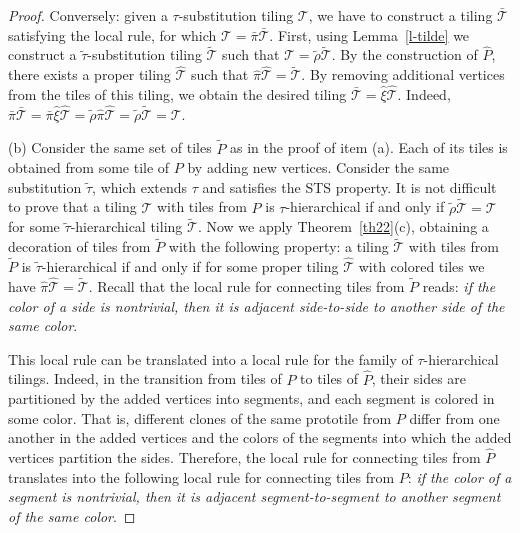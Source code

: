 \documentclass[12pt]{article}
\theoremstyle{remark}
\begin{document}
\begin{proof}
Conversely: given a $\tau$-substitution tiling $\mathcal T$, we have 
to construct a tiling $\bar{\mathcal T}$ satisfying the local rule,
for which $\mathcal T=\bar{\pi}\bar{\mathcal T}$.
First, using Lemma~\ref{l-tilde}
we construct a $\tilde\tau$-substitution tiling $\tilde{\mathcal T}$ such that
$\mathcal T=\tilde{\rho}\tilde{\mathcal T}$.
By the construction of $\hat P$, there exists a
proper tiling $\hat{\mathcal T}$ such that $\hat\pi\hat{\mathcal T}=\tilde{\mathcal T}$. By removing additional vertices from the tiles of this tiling,
we obtain the desired tiling $\bar{\mathcal T}=\hat\xi\hat{\mathcal T}$.
Indeed,
$
\bar\pi\bar{\mathcal T}=\bar\pi\hat\xi\hat{\mathcal T}=\tilde\rho\hat\pi\hat{\mathcal T}=\tilde{\rho}\tilde{\mathcal T}={\mathcal T}.
$
 



(b) Consider the same set of tiles $\tilde P$ as in the proof of item (a).
Each of its tiles is obtained from some tile of 
$P$ by adding new vertices. Consider 
the same substitution $\tilde\tau$, which extends $\tau$ and satisfies the STS property.
It is not difficult to prove that a tiling $\mathcal T$ with tiles from $P$ is $\tau$-hierarchical if and only if 
$\tilde\rho\tilde{\mathcal T}=\mathcal T$ for some  $\tilde\tau$-hierarchical tiling 
$\tilde{\mathcal T}$. 
Now we apply Theorem~\ref{th22}(c), 
obtaining a decoration of tiles from $\tilde P$ with the following property:
a tiling $\tilde{\mathcal T}$ with tiles from $\tilde P$ is $\tilde\tau$-hierarchical
if and only if for some proper tiling $\hat{\mathcal T}$ with colored 
tiles we have $\hat\pi \hat{\mathcal T}=\tilde{\mathcal T}$. 
Recall that the local rule for connecting tiles from $\tilde P$ reads:
\emph{if the color of a side is nontrivial, 
then it is adjacent side-to-side to another side of the same color}.

This local rule can be translated into a local rule
for the family of $\tau$-hierarchical tilings.
Indeed, in the transition from tiles of $P$ to tiles of $\hat P$, their sides 
are partitioned by the added vertices into segments, and each segment is colored in some color.
That is, different clones of the same prototile from $P$ differ from one another
in the added vertices and the colors of the segments into which the added vertices partition
the sides. Therefore, the local rule for connecting tiles from $\hat P$
translates into the following local rule for connecting tiles from $P$:
\emph{if the color of a segment is nontrivial, 
then it is adjacent segment-to-segment to another segment of the same color}.
\end{proof}
\end{document}
